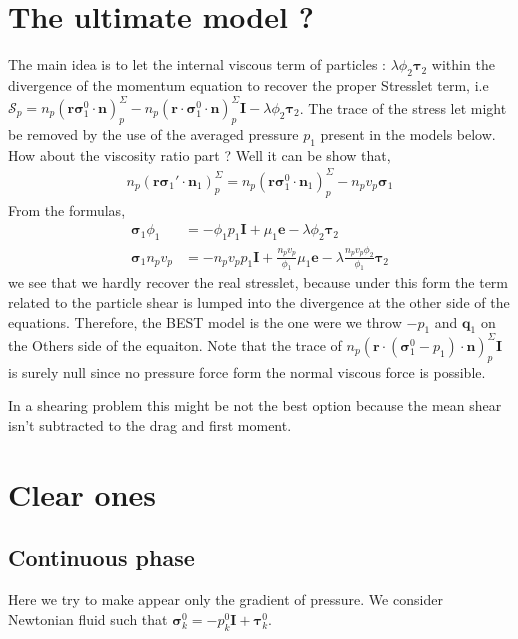 \Huge{ }\normalsize


\section{The ultimate model ?}
The main idea is to let the internal viscous term of particles : $\lambda \phi_2 \bm{\tau}_2$ within the divergence of the momentum equation to recover the proper Stresslet term, i.e $\mathscr{S}_p = n_p(\textbf{r} \bm{\sigma}_1^0 \cdot \textbf{n})_p^\Sigma -n_p(\textbf{r} \cdot \bm{\sigma}_1^0 \cdot \textbf{n})_p^\Sigma \textbf{I} - \lambda \phi_2 \bm{\tau}_2$. 
The trace of the stress let might be removed by the use of the averaged pressure $p_1$ present in the models below. 
How about the viscosity ratio part ? Well it can be show that, 
\begin{align*}
    n_p (\textbf{r} \bm{\sigma}_1'\cdot \textbf{n}_1)_p^\Sigma
    = 
    n_p (\textbf{r} \bm{\sigma}_1^0\cdot \textbf{n}_1)_p^\Sigma
    - n_p v_p \bm{\sigma}_1 
\end{align*}
From the formulas, 
\begin{align*}
    \bm{\sigma}_1 \phi_1
    &=- \phi_1 p_1 \textbf{I}
    + \mu_1 \textbf{e}
    - \lambda \phi_2 \bm{\tau}_2\\
    \bm{\sigma}_1 n_p v_p 
    &=- n_p v_p p_1 \textbf{I}
    + \frac{n_p v_p}{\phi_1}\mu_1 \textbf{e}
    - \lambda \frac{n_pv_p\phi_2}{\phi_1} \bm{\tau}_2
\end{align*}
we see that we hardly recover the real stresslet, because under this form the term related to the particle shear is lumped into the divergence at the other side of the equations. 
Therefore, the BEST model is the one were we throw $-p_1$ and $\textbf{q}_1$ on the Others side of the  equaiton. 
Note that the trace of $n_p(\textbf{r} \cdot (\bm{\sigma}_1^0 - p_1) \cdot \textbf{n})_p^\Sigma \textbf{I}$ is surely null since no pressure force form the normal viscous force is possible. 

In a shearing problem this might be not the best option because the mean shear isn't subtracted to the drag and first moment. 



\section{Clear ones}
\subsection{Continuous phase}
Here we try to make appear only the gradient of pressure. 
We consider Newtonian fluid such that $\bm{\sigma}_k^0 = -p^0_k \textbf{I} + \bm{\tau}_k^0$. 

